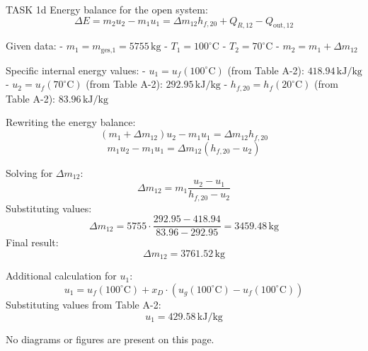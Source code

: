 TASK 1d  
Energy balance for the open system:  
\[
\Delta E = m_2 u_2 - m_1 u_1 = \Delta m_{12} h_{f,20} + Q_{R,12} - Q_{\text{out},12}
\]  

Given data:  
- \( m_1 = m_{\text{ges,1}} = 5755 \, \text{kg} \)  
- \( T_1 = 100^\circ\text{C} \)  
- \( T_2 = 70^\circ\text{C} \)  
- \( m_2 = m_1 + \Delta m_{12} \)  

Specific internal energy values:  
- \( u_1 = u_f(100^\circ\text{C}) \) (from Table A-2): \( 418.94 \, \text{kJ/kg} \)  
- \( u_2 = u_f(70^\circ\text{C}) \) (from Table A-2): \( 292.95 \, \text{kJ/kg} \)  
- \( h_{f,20} = h_f(20^\circ\text{C}) \) (from Table A-2): \( 83.96 \, \text{kJ/kg} \)  

Rewriting the energy balance:  
\[
(m_1 + \Delta m_{12}) u_2 - m_1 u_1 = \Delta m_{12} h_{f,20}
\]  
\[
m_1 u_2 - m_1 u_1 = \Delta m_{12} (h_{f,20} - u_2)
\]  

Solving for \( \Delta m_{12} \):  
\[
\Delta m_{12} = m_1 \frac{u_2 - u_1}{h_{f,20} - u_2}
\]  
Substituting values:  
\[
\Delta m_{12} = 5755 \cdot \frac{292.95 - 418.94}{83.96 - 292.95} = 3459.48 \, \text{kg}
\]  
Final result:  
\[
\Delta m_{12} = 3761.52 \, \text{kg}
\]  

Additional calculation for \( u_1 \):  
\[
u_1 = u_f(100^\circ\text{C}) + x_D \cdot \left( u_g(100^\circ\text{C}) - u_f(100^\circ\text{C}) \right)
\]  
Substituting values from Table A-2:  
\[
u_1 = 429.58 \, \text{kJ/kg}
\]  

No diagrams or figures are present on this page.